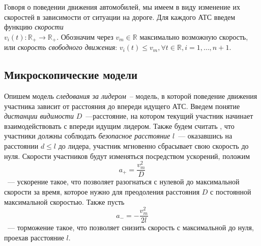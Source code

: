 \documentclass[12pt, a4paper]{article}
\begin{document}
Говоря о поведении движения автомобилей, мы имеем в виду изменение их скоростей в зависимости от ситуации на дороге. Для каждого АТС введем функцию \textit{скорости} \\ ${v_i(t) : \mathbb {R}_+ \rightarrow \mathbb {R}_+}$.  Обозначим через $v_m \in \mathbb {R}$ максимально возможную скорость, или \textit{скорость свободного движения}: $v_i(t) \leq v_m, \forall t \in \mathbb {R}, i = 1, \dots, n+1$.

\subsection{Микроскопические модели}
Опишем модель \textit{следования за лидером}~-- модель, в которой поведение движения участника зависит от расстояния до впереди идущего АТС. 
Введем понятие \textit{дистанции видимости} $D$~---расстояние, на котором текущий участник начинает взаимодействовать с впереди идущим лидером. Также будем считать , что участники должны соблюдать \textit{безопасное расстояние} $l$~--- оказавшись на расстоянии $d \leq l$ до лидера, участник мгновенно сбрасывает свою скорость до нуля. Скорости участников будут изменяться посредством ускорений, положим
$$a_+ = \frac{v^2_m}{D}$$~--- ускорение такое, что позволяет разогнаться с нулевой до максимальной скорости за время, которое нужно для преодоления расстояния $D$ с постоянной максимальной скоростью. 
Также пусть $$a_- = -\frac{v^2_m}{2l}$$~--- торможение такое, что позволяет снизить скорость с максимальной до нуля, проехав расстояние $l$.
\end{document}
